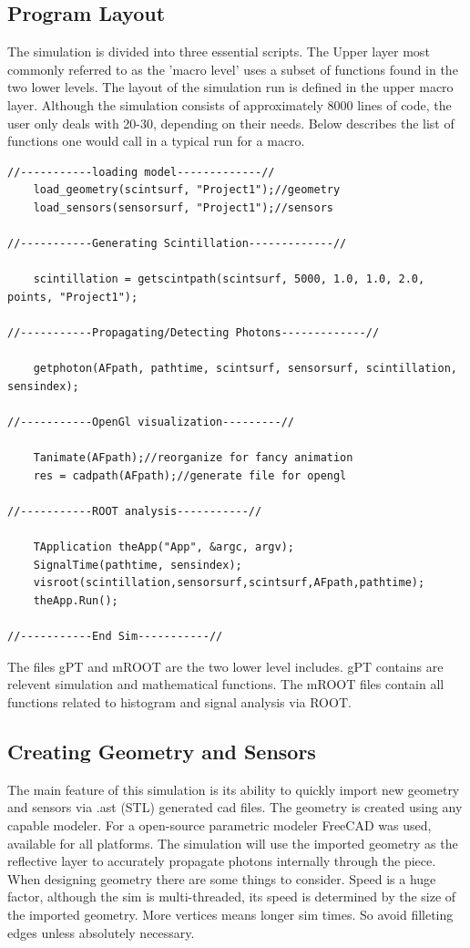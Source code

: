 \documentclass[paper=a4, fontsize=11pt]{scrartcl}
\numberwithin{equation}{section}		%
\numberwithin{figure}{section}			%
\numberwithin{table}{section}				%
\begin{document}
\subsection{Program Layout}
 The simulation is divided into three essential scripts. The Upper layer most commonly referred to as the 'macro level' uses a subset of functions found in the two lower levels. The layout of the simulation run is defined in the upper macro layer. Although the simulation consists of approximately 8000 lines of code, the user only deals with 20-30, depending on their needs. Below describes the list of functions one would call in a typical run for a macro.
\begin{lstlisting}
//-----------loading model-------------//
    load_geometry(scintsurf, "Project1");//geometry
    load_sensors(sensorsurf, "Project1");//sensors

//-----------Generating Scintillation-------------//

    scintillation = getscintpath(scintsurf, 5000, 1.0, 1.0, 2.0, points, "Project1");

//-----------Propagating/Detecting Photons-------------//

    getphoton(AFpath, pathtime, scintsurf, sensorsurf, scintillation, sensindex);	     	

//-----------OpenGl visualization---------//

	Tanimate(AFpath);//reorganize for fancy animation
	res = cadpath(AFpath);//generate file for opengl

//-----------ROOT analysis-----------// 

	TApplication theApp("App", &argc, argv);
	SignalTime(pathtime, sensindex);
	visroot(scintillation,sensorsurf,scintsurf,AFpath,pathtime);
	theApp.Run();

//-----------End Sim-----------//

\end{lstlisting} 
The files gPT and mROOT are the two lower level includes. gPT contains are relevent simulation and mathematical functions. The mROOT files contain all functions related to histogram and signal analysis via ROOT.

\subsection{Creating Geometry and Sensors}
The main feature of this simulation is its ability to quickly import new geometry and sensors via .ast (STL) generated cad files. The geometry is created using any capable modeler. For a open-source parametric modeler FreeCAD was used, available for all platforms. The simulation will use the imported geometry as the reflective layer to accurately propagate photons internally through the piece. When designing geometry there are some things to consider. Speed is a huge factor, although the sim is multi-threaded, its speed is determined by the size of the imported geometry. More vertices means longer sim times. So avoid filleting edges unless absolutely necessary.
\end{document}
